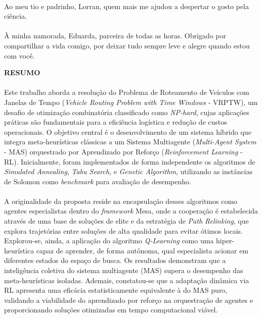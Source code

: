 \paragraph{}Ao meu tio e padrinho, Lorran, quem mais me ajudou a despertar o gosto pela ciência.

\paragraph{}À minha namorada, Eduarda, parceira de todas as horas. Obrigado por compartilhar a vida comigo, por deixar tudo sempre leve e alegre quando estou com você.


\pagebreak


\begin{center}
\textbf{RESUMO}
\end{center}
      \vspace{0.5cm}

\paragraph{}Este trabalho aborda a resolução do Problema de Roteamento de Veículos com Janelas de Tempo (\textit{Vehicle Routing Problem with Time Windows} - VRPTW), um desafio de otimização combinatória classificado como \textit{NP-hard}, cujas aplicações práticas são fundamentais para a eficiência logística e redução de custos operacionais. O objetivo central é o desenvolvimento de um sistema híbrido que integra meta-heurísticas clássicas a um Sistema Multiagente (\textit{Multi-Agent System} - MAS) orquestrado por Aprendizado por Reforço (\textit{Reinforcement Learning} - RL). Inicialmente, foram implementados de forma independente os algoritmos de \textit{Simulated Annealing}, \textit{Tabu Search}, e \textit{Genetic Algorithm}, utilizando as instâncias de Solomon como \textit{benchmark} para avaliação de desempenho.

\paragraph{}A originalidade da proposta reside na encapsulação desses algoritmos como agentes especialistas dentro do \textit{framework} Mesa, onde a cooperação é estabelecida através de uma base de soluções de elite e da estratégia de \textit{Path Relinking}, que explora trajetórias entre soluções de alta qualidade para evitar ótimos locais. Explorou-se, ainda, a aplicação do algoritmo \textit{Q-Learning} como uma hiper-heurística capaz de aprender, de forma autônoma, qual especialista acionar em diferentes estados do espaço de busca. Os resultados demonstram que a inteligência coletiva do sistema multiagente (MAS) supera o desempenho das meta-heurísticas isoladas. Ademais, constatou-se que a adaptação dinâmica via RL apresenta uma eficácia estatisticamente equivalente à do MAS puro, validando a viabilidade do aprendizado por reforço na orquestração de agentes e proporcionando soluções otimizadas em tempo computacional viável.

